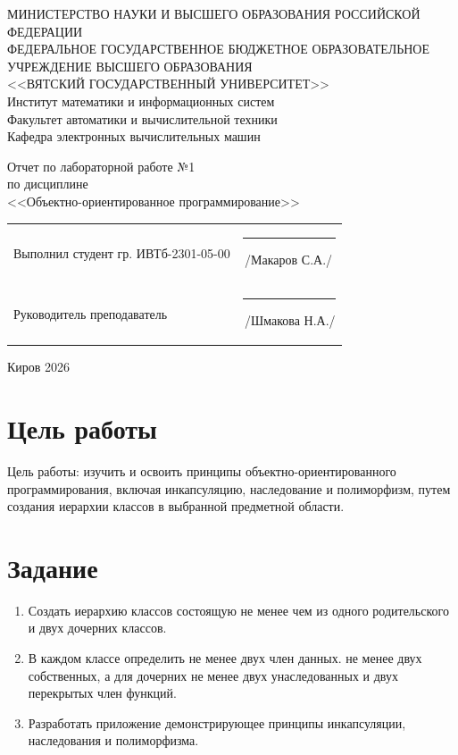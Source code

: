 \documentclass[a4paper,14pt]{extarticle}
\begin{document}
\newpage\thispagestyle{empty}
\begin{center}
  \MakeUppercase{
    Министерство науки и высшего образования Российской Федерации\\
    Федеральное государственное бюджетное образовательное учреждение высшего образования\\
    <<Вятский Государственный Университет>>\\
  }
  Институт математики и информационных систем\\
  Факультет автоматики и вычислительной техники\\
  Кафедра электронных вычислительных машин
\end{center}
\vfill

\begin{center}
  Отчет по лабораторной работе №1\\
  по дисциплине\\
  <<Объектно-ориентированное программирование>>\\
\end{center}
\vfill

\noindent
\begin{tabular}{ll}
  Выполнил студент гр. ИВТб-2301-05-00 \hspace{5mm} & \rule[-1mm]{25mm}{0.10mm}\,/Макаров С.А./ \\
  Руководитель преподаватель                        & \rule[-1mm]{25mm}{0.10mm}\,/Шмакова Н.А./ \\
\end{tabular}

\vfill
\begin{center}
  Киров 2026
\end{center}

\newpage
\section*{\hspace{12.5mm}Цель работы}
Цель работы: изучить и освоить принципы объектно-ориентированного программирования, включая инкапсуляцию, наследование и полиморфизм, путем создания иерархии классов в выбранной предметной области.

\section*{\hspace{12.5mm}Задание}
\begin{enumerate}
  \item Создать иерархию классов состоящую не менее чем из одного родительского  и двух дочерних классов.
  \item В каждом классе определить не менее  двух член данных. не менее двух собственных, а для дочерних не менее двух унаследованных и двух перекрытых член функций.
  \item Разработать приложение демонстрирующее принципы инкапсуляции, наследования и полиморфизма.
\end{enumerate}
\end{document}
